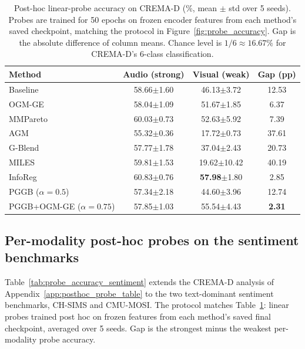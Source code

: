 \documentclass{article}
\begin{document}
\begin{table}[H]
\centering
\caption{Post-hoc linear-probe accuracy on CREMA-D (\%, mean $\pm$ std over 5 seeds). Probes are trained for 50 epochs on frozen encoder features from each method's saved checkpoint, matching the protocol in Figure~\ref{fig:probe_accuracy}. Gap is the absolute difference of column means. Chance level is $1/6 \approx 16.67\%$ for CREMA-D's 6-class classification.}
\label{tab:probe_accuracy}
\vspace{0.3em}
\begin{tabular}{lccc}
\toprule
\textbf{Method} & \textbf{Audio (strong)} & \textbf{Visual (weak)} & \textbf{Gap (pp)} \\
\midrule
Baseline                        & 58.66{\scriptsize$\pm$1.60}  & 46.13{\scriptsize$\pm$3.72}  & 12.53 \\
OGM-GE                          & 58.04{\scriptsize$\pm$1.09}  & 51.67{\scriptsize$\pm$1.85}  & 6.37 \\
MMPareto                        & 60.03{\scriptsize$\pm$0.73}  & 52.63{\scriptsize$\pm$5.92}  & 7.39 \\
AGM                             & 55.32{\scriptsize$\pm$0.36}  & 17.72{\scriptsize$\pm$0.73}  & 37.61 \\
G-Blend                         & 57.77{\scriptsize$\pm$1.78}  & 37.04{\scriptsize$\pm$2.43}  & 20.73 \\
MILES                           & 59.81{\scriptsize$\pm$1.53}  & 19.62{\scriptsize$\pm$10.42} & 40.19 \\
InfoReg                         & 60.83{\scriptsize$\pm$0.76}  & \textbf{57.98}{\scriptsize$\pm$1.80}  & 2.85 \\
PGGB ($\alpha{=}0.5$)           & 57.34{\scriptsize$\pm$2.18}  & 44.60{\scriptsize$\pm$3.96}  & 12.74 \\
PGGB+OGM-GE ($\alpha{=}0.75$)   & 57.85{\scriptsize$\pm$1.03}  & 55.54{\scriptsize$\pm$4.43}  & \textbf{2.31} \\
\bottomrule
\end{tabular}
\end{table}

\subsection{Per-modality post-hoc probes on the sentiment benchmarks}
\label{app:posthoc_sentiment}

Table~\ref{tab:probe_accuracy_sentiment} extends the CREMA-D analysis of Appendix~\ref{app:posthoc_probe_table} to the two text-dominant sentiment benchmarks, CH-SIMS and CMU-MOSI. The protocol matches Table~\ref{tab:probe_accuracy}: linear probes trained post hoc on frozen features from each method's saved final checkpoint, averaged over 5 seeds. Gap is the strongest minus the weakest per-modality probe accuracy.
\end{document}
